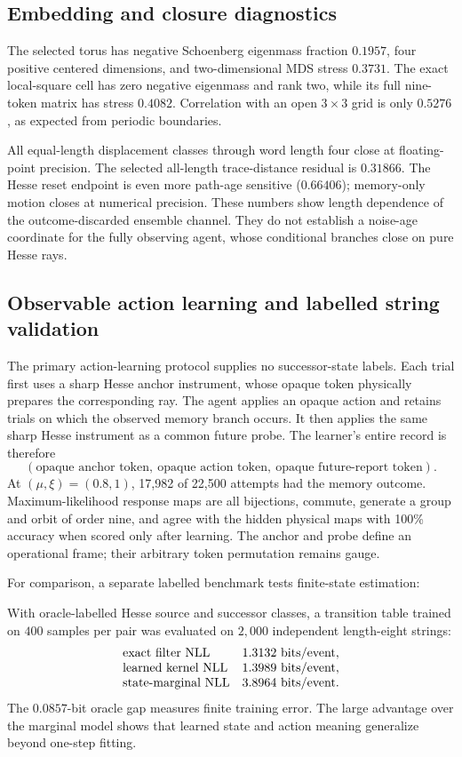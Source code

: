 \documentclass[11pt]{article}
\theoremstyle{definition}
\theoremstyle{remark}
\begin{document}
\subsection{Embedding and closure diagnostics}

The selected torus has negative Schoenberg eigenmass fraction \(0.1957\),
four positive centered dimensions, and two-dimensional MDS stress \(0.3731\).
The exact local-square cell has zero negative eigenmass and rank two, while its
full nine-token matrix has stress \(0.4082\). Correlation with an open
\(3\times3\) grid is only \(0.5276\), as expected from periodic boundaries.

All equal-length displacement classes through word length four close at
floating-point precision. The selected all-length trace-distance residual is
\(0.31866\). The Hesse reset endpoint is even more path-age sensitive
(\(0.66406\)); memory-only motion closes at numerical precision. These
numbers show length dependence of the outcome-discarded ensemble channel. They
do not establish a noise-age coordinate for the fully observing agent, whose
conditional branches close on pure Hesse rays.

\subsection{Observable action learning and labelled string validation}

The primary action-learning protocol supplies no successor-state labels. Each
trial first uses a sharp Hesse anchor instrument, whose opaque token physically
prepares the corresponding ray. The agent applies an opaque action and retains
trials on which the observed memory branch occurs. It then applies the same
sharp Hesse instrument as a common future probe. The learner's entire record is
therefore
\[
(\text{opaque anchor token},\ \text{opaque action token},\
  \text{opaque future-report token}).
\]
At \((\mu,\xi)=(0.8,1)\), 17,982 of 22,500 attempts had the memory outcome.
Maximum-likelihood response maps are all bijections, commute, generate a group
and orbit of order nine, and agree with the hidden physical maps with 100\%
accuracy when scored only after learning. The anchor and probe define an
operational frame; their arbitrary token permutation remains gauge.

For comparison, a separate labelled benchmark tests finite-state estimation:

With oracle-labelled Hesse source and successor classes, a transition table trained on
\(400\) samples per pair was evaluated on \(2{,}000\) independent
length-eight strings:
\[
\begin{array}{lc}
\text{exact filter NLL}&1.3132\ {\rm bits/event},\\
\text{learned kernel NLL}&1.3989\ {\rm bits/event},\\
\text{state-marginal NLL}&3.8964\ {\rm bits/event}.
\end{array}
\]
The \(0.0857\)-bit oracle gap measures finite training error. The large
advantage over the marginal model shows that learned state and action meaning
generalize beyond one-step fitting.
\end{document}
